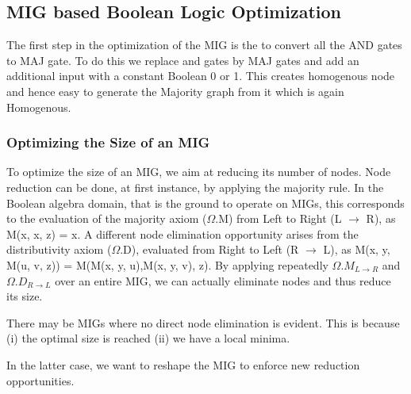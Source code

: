 \documentclass[
	accentcolor=1c,%
	type=intern,
	marginpar=false,
	ruledheaders=section,
	class=report,
	BCOR=5mm,
      parskip=half-,
	fontsize=10pt
	]{tudapub}
\begin{document}
	\subsection{MIG based Boolean Logic Optimization}

	The first step in the optimization of the MIG is the to convert all the AND gates to MAJ gate. To do this we replace and gates by MAJ gates and add an additional input with a constant Boolean 0 or 1. This creates homogenous node and hence easy to generate the Majority graph from it which is again Homogenous.
	\newline

	\subsubsection{Optimizing the Size of an MIG}
	To optimize the size of an MIG, we aim at reducing its number of nodes. Node reduction can be done, at first instance, by applying the majority rule. In the Boolean algebra domain, that is the ground to operate on MIGs, this corresponds to the evaluation of the majority axiom ($\Omega$.M) from Left to Right (L $\rightarrow$ R), as M(x, x, z) = x. A different node elimination opportunity arises from the distributivity axiom ($\Omega$.D), evaluated from Right to Left (R $\rightarrow$ L), as M(x, y, M(u, v, z)) = M(M(x, y, u),M(x, y, v), z). By applying repeatedly $\Omega.M_{L\rightarrow R}$ and $\Omega.D_{R\rightarrow L}$ over an entire MIG, we can actually eliminate nodes and thus reduce its size. \newline

	There may be MIGs where no direct node elimination is evident. This is because\newline
	(i)	the optimal size is reached \newline
	(ii)  we have a local minima. \newline

	In the latter case, we want to reshape the MIG to enforce new reduction opportunities. \newline
\end{document}
